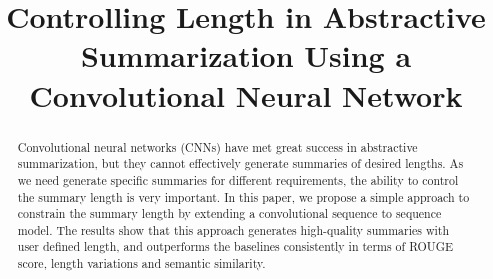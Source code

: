 \documentclass[11pt]{article}
\title{Controlling Length in Abstractive Summarization Using a Convolutional
Neural Network}
\date{}
\begin{document}
\maketitle
\begin{abstract}
Convolutional neural networks (CNNs) have met great success
in abstractive summarization, but they
cannot effectively generate summaries
of desired lengths. As we need generate specific summaries for
different requirements, the ability to control the summary length
is very important.
In this paper, we propose a simple approach
to constrain the summary length by extending a convolutional
sequence to sequence model.
The results show that this approach generates high-quality summaries
with user defined length, and outperforms the baselines consistently in terms of
ROUGE score, length variations and semantic similarity.
\end{abstract}


%







\end{document}
